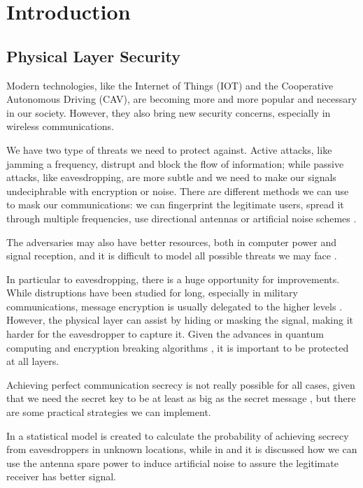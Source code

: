 \section{Introduction}
\subsection{Physical Layer Security}

Modern technologies, like the Internet of Things (IOT) and the Cooperative Autonomous Driving (CAV), are becoming more and more popular and necessary in our society. However, they also bring new security concerns, especially in wireless communications.

We have two type of threats we need to protect against. Active attacks, like jamming a frequency, distrupt and block the flow of information; while passive attacks, like eavesdropping, are more subtle and we need to make our signals undeciphrable with encryption or noise. There are different methods we can use to mask our communications: we can fingerprint the legitimate users, spread it through multiple frequencies, use directional antennas or artificial noise schemes \cite{5751298}.

The adversaries may also have better resources, both in computer power and signal reception, and it is difficult to model all possible threats we may face \cite{7120011}.

In particular to eavesdropping, there is a huge opportunity for improvements. While distruptions have been studied for long, especially in military communications, message encryption is usually delegated to the higher levels \cite{6739367}. However, the physical layer can assist by hiding or masking the signal, making it harder for the eavesdropper to capture it. Given the advances in quantum computing and encryption breaking algorithms \cite{365700}, it is important to be protected at all layers.

Achieving perfect communication secrecy is not really possible for all cases, given that we need the secret key to be at least as big as the secret message \cite{6769090}, but there are some practical strategies we can implement.

In \cite{7543509} a statistical model is created to calculate the probability of achieving secrecy from eavesdroppers in unknown locations, while in \cite{4543070} and \cite{1605889} it is discussed how we can use the antenna spare power to induce artificial noise to assure the legitimate receiver has better signal.

